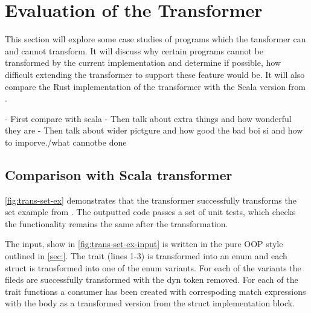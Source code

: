 \documentclass[ oneside,%
                    author={James Elgar},
                    degree={MEng},
                     title={Bidirectional transformer between functional and \\ object-oriented programming in Rust},
                  subtitle={}]{dissertation}
\begin{document}
% 


\chapter{Evaluation of the Transformer}
\label{chap:evaluation}

This section will explore some case studies of programs which the tansformer can and cannot transform. It will discuss why certain programs cannot be transformed by the current implementation and determine if possible, how difficult extending the transformer to support these feature would be. It will also compare the Rust implementation of the transformer with the Scala version from \cite{food}.

- First compare with scala
- Then talk about extra things and how wonderful they are
- Then talk about wider pictgure and how good the bad boi si and how to imporve./what cannotbe done  



\section{Comparison with Scala transformer} 

\autoref{fig:trans-set-ex} demonstrates that the transformer successfully transforms the set example from \cite{food}. 
The outputted code passes a set of unit tests, which checks the functionality remains the same after the transformation.

The input, show in \autoref{fig:trans-set-ex-input} is written in the pure OOP style outlined in \autoref{sec:}. The trait (lines 1-3) is transformed into an enum and each struct is transformed into one of the enum variants. For each of the variants the fileds are successfully transformed with the dyn token removed. For each of the trait functions a consumer has been created with correspoding match expressions with the body as a transformed version from the struct implementation block.
\end{document}

